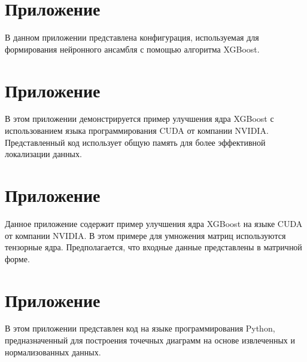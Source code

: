 \documentclass[14pt, a4paper]{../cls/coursework}
\begin{document}
     \label{sec:attachements}

    \section{Приложение }
    \label{subsec:polaris_learn_config}

    В данном приложении представлена конфигурация, используемая для формирования нейронного ансамбля с помощью алгоритма XGBoost.

    

    \section{Приложение } \label{subsec:xgboost_cuda_shared_memory_upgrade}

    В этом приложении демонстрируется пример улучшения ядра XGBoost с использованием языка программирования CUDA от компании NVIDIA. Представленный код использует общую память для более эффективной локализации данных.

    

    \section{Приложение } \label{subsec:xgboost_cuda_tensor_upgrade}

    Данное приложение содержит пример улучшения ядра XGBoost на языке CUDA от компании NVIDIA. В этом примере для умножения матриц используются тензорные ядра. Предполагается, что входные данные представлены в матричной форме.

    

    \section{Приложение }
    \label{subsec:dot_diagram_code}

    В этом приложении представлен код на языке программирования Python, предназначенный для построения точечных диаграмм на основе извлеченных и нормализованных данных.

    
\end{document}

